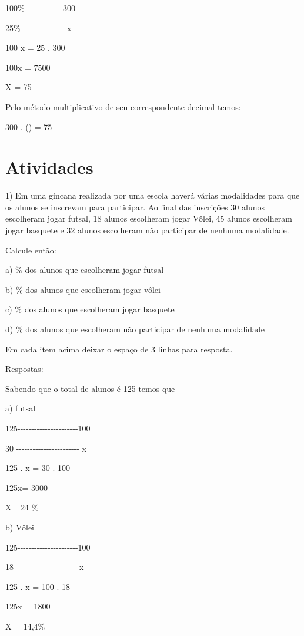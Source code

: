 100\% -\/-\/-\/-\/-\/-\/-\/-\/-\/-\/-\/- 300

25\% -\/-\/-\/-\/-\/-\/-\/-\/-\/-\/-\/-\/-\/-\/- x

100 x = 25 . 300

100x = 7500

X = 75

Pelo método multiplicativo de seu correspondente decimal temos:

300 . () = 75

\section{Atividades}

1) Em uma gincana realizada por uma escola haverá várias modalidades
para que os alunos se inscrevam para participar. Ao final das inscrições
30 alunos escolheram jogar futsal, 18 alunos escolheram jogar Vôlei, 45
alunos escolheram jogar basquete e 32 alunos escolheram não participar
de nenhuma modalidade.

Calcule então:

a) \% dos alunos que escolheram jogar futsal

b) \% dos alunos que escolheram jogar vôlei

c) \% dos alunos que escolheram jogar basquete

d) \% dos alunos que escolheram não participar de nenhuma modalidade

Em cada item acima deixar o espaço de 3 linhas para resposta.

Respostas:

Sabendo que o total de alunos é 125 temos que

a) futsal

125-\/-\/-\/-\/-\/-\/-\/-\/-\/-\/-\/-\/-\/-\/-\/-\/-\/-\/-\/-\/-\/-100

30 -\/-\/-\/-\/-\/-\/-\/-\/-\/-\/-\/-\/-\/-\/-\/-\/-\/-\/-\/-\/-\/-\/- x

125 . x = 30 . 100

125x= 3000

X= 24 \%

b) Vôlei

125-\/-\/-\/-\/-\/-\/-\/-\/-\/-\/-\/-\/-\/-\/-\/-\/-\/-\/-\/-\/-\/-100

18-\/-\/-\/-\/-\/-\/-\/-\/-\/-\/-\/-\/-\/-\/-\/-\/-\/-\/-\/-\/-\/-\/- x

125 . x = 100 . 18

125x = 1800

X = 14,4\%

